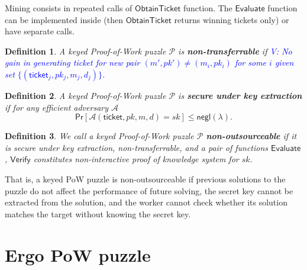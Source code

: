 \documentclass[]{article}
\newcommand{\vk}[1]{\textcolor{blue}{V: {#1}}}
\newcommand{\Ticket}{\mathsf{ticket}}
\newcommand{\Eval}{\mathsf{Evaluate}}
\newcommand{\Verify}{\mathsf{Verify}}
\newcommand{\ObtainTicket}{\mathsf{ObtainTicket}}
\newtheorem{definition}{Definition}
\begin{document}
    Mining consists in repeated calls of $\ObtainTicket$ function.
    The $\Eval$ function can be implemented inside (then $\ObtainTicket$
    returns winning tickets only) or have separate calls.

    \begin{definition}
        A keyed Proof-of-Work puzzle $\mathcal{P}$ is {\bf non-transferrable} if
        \vk{No gain in generating ticket for new pair $(m',pk')\ne (m_i,pk_i)$
            for some $i$ given set $\{(\Ticket_j, pk_j, m_j, d_j)\}$.}
    \end{definition}

    \begin{definition}
        A keyed Proof-of-Work puzzle $\mathcal{P}$ is {\bf secure under key
        extraction} if for any efficient adversary $\mathcal{A}$
        \begin{equation}
            \mathsf{Pr}[\mathcal{A}(\Ticket,pk,m,d)=sk]\le\mathsf{negl}(\lambda).
        \end{equation}
    \end{definition}

    \begin{definition}
        We call a keyed Proof-of-Work puzzle $\mathcal{P}$ {\bf
        non-outsourceable} if it is secure under key extraction,
        non-transferrable, and a pair of functions $\Eval$, $\Verify$
        constitutes non-interactive proof of knowledge system for $sk$.
    \end{definition}

    That is, a keyed PoW puzzle is non-outsourceable if previous solutions to
    the puzzle do not affect the performance of future solving, the secret key
    cannot be extracted from the solution, and the worker cannot check
    whether its solution matches the target without knowing the secret key.

    \section{Ergo PoW puzzle}
    \label{puzzle}
\end{document}
